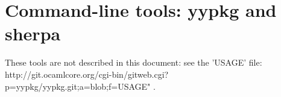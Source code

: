 \documentclass[a4paper]{article}
\begin{document}
% 
% 
% 
% 

\section{Command-line tools: yypkg and sherpa}
These tools are not described in this document: see the 'USAGE' file:
http://git.ocamlcore.org/cgi-bin/gitweb.cgi?p=yypkg/yypkg.git;a=blob;f=USAGE" .
\end{document}
